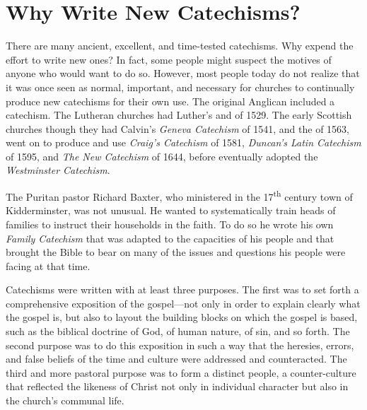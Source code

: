 \documentclass[titlepage]{memoir}
\begin{document}
\section{Why Write New Catechisms?}
There are many ancient, excellent, and time-tested catechisms. Why expend the effort to write new ones? In fact, some people might suspect the motives of anyone who would want to do so. However, most people today do not realize that it was once seen as normal, important, and necessary for churches to continually produce new catechisms for their own use. The original Anglican \/ included a catechism. The Lutheran churches had Luther's \/ and \/ of 1529. The early Scottish churches though they had Calvin's {\em Geneva Catechism}\/ of 1541, and the \/ of 1563, went on to produce and use \emph{Craig's Catechism}\/ of 1581, \emph{Duncan's Latin Catechism}\/ of 1595, and \emph{The New Catechism}\/ of 1644, before eventually adopted the \emph{Westminster Catechism}.

The Puritan pastor Richard Baxter, who ministered in the 17\textsuperscript{th} century town of Kidderminster, was not unusual. He wanted to systematically train heads of families to instruct their households in the faith. To do so he wrote his own \emph{Family Catechism}\/ that was adapted to the capacities of his people and that brought the Bible to bear on many of the issues and questions his people were facing at that time.

Catechisms were written with at least three purposes. The first was to set forth a comprehensive exposition of the gospel\thinspace{}---\thinspace{}not only in order to explain clearly what the gospel is, but also to layout the building blocks on which the gospel is based, such as the biblical doctrine of God, of human nature, of sin, and so forth. The second purpose was to do this exposition in such a way that the heresies, errors, and false beliefs of the time and culture were addressed and counteracted. The third and more pastoral purpose was to form a distinct people, a counter-culture that reflected the likeness of Christ not only in individual character but also in the church's communal life.
\end{document}

